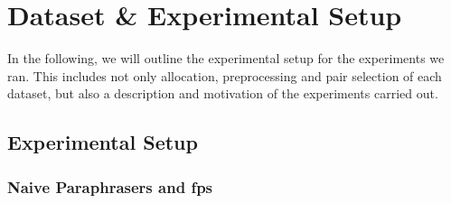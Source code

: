 \chapter{Dataset \& Experimental Setup}
\label{chap:dataset_experimental_setup}

In the following, we will outline the experimental setup for the experiments we ran.
This includes not only allocation, preprocessing and pair selection of each dataset, but also a description and motivation of the experiments carried out.




\section{Experimental Setup}
\label{sec:experimental_setup}









\subsection{Naive Paraphrasers and \acp{fp}}









